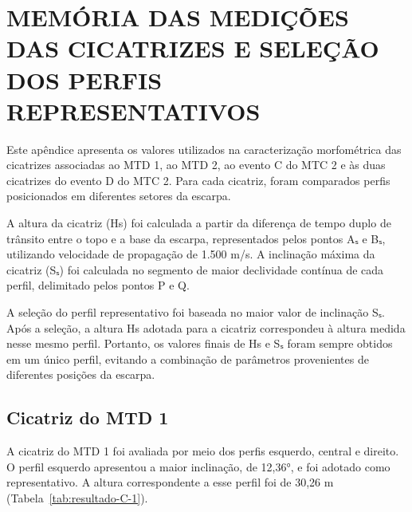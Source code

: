 \chapter{MEMÓRIA DAS MEDIÇÕES DAS CICATRIZES E SELEÇÃO DOS PERFIS REPRESENTATIVOS}\label{ap:medicoes-cicatrizes}
\setcounter{figure}{0}
\setcounter{table}{0}
\setcounter{quadro}{0}

Este apêndice apresenta os valores utilizados na caracterização morfométrica das cicatrizes associadas ao MTD 1, ao MTD 2, ao evento C do MTC 2 e às duas cicatrizes do evento D do MTC 2. Para cada cicatriz, foram comparados perfis posicionados em diferentes setores da escarpa.

A altura da cicatriz (Hs) foi calculada a partir da diferença de tempo duplo de trânsito entre o topo e a base da escarpa, representados pelos pontos Aₛ e Bₛ, utilizando velocidade de propagação de 1.500 m/s. A inclinação máxima da cicatriz (Sₛ) foi calculada no segmento de maior declividade contínua de cada perfil, delimitado pelos pontos P e Q.

A seleção do perfil representativo foi baseada no maior valor de inclinação Sₛ. Após a seleção, a altura Hs adotada para a cicatriz correspondeu à altura medida nesse mesmo perfil. Portanto, os valores finais de Hs e Sₛ foram sempre obtidos em um único perfil, evitando a combinação de parâmetros provenientes de diferentes posições da escarpa.

\section{Cicatriz do MTD 1}

A cicatriz do MTD 1 foi avaliada por meio dos perfis esquerdo, central e direito. O perfil esquerdo apresentou a maior inclinação, de 12,36°, e foi adotado como representativo. A altura correspondente a esse perfil foi de 30,26 m (Tabela~\ref{tab:resultado-C-1}).

